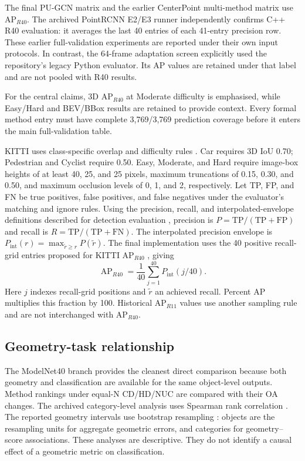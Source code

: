 The final PU-GCN matrix and the earlier CenterPoint multi-method matrix
use AP$_{R40}$. The archived PointRCNN E2/E3 runner independently confirms
C++ R40 evaluation: it averages the last 40 entries of each 41-entry
precision row. These earlier full-validation experiments are reported
under their own input protocols. In contrast, the 64-frame adaptation
screen explicitly used the repository's legacy Python evaluator. Its AP
values are retained under that label and are not pooled with R40 results.

For the central claims, 3D AP$_{R40}$ at Moderate difficulty is emphasised, while Easy/Hard and BEV/BBox results are retained to provide context. Every formal method entry must have complete 3,769/3,769 prediction coverage before it enters the main full-validation table.

KITTI uses class-specific overlap and difficulty rules \cite{kittieval2026}.
Car requires 3D IoU 0.70; Pedestrian and Cyclist require 0.50. Easy,
Moderate, and Hard require image-box heights of at least 40, 25, and
25 pixels, maximum truncations of 0.15, 0.30, and 0.50, and maximum
occlusion levels of 0, 1, and 2, respectively. Let TP, FP, and FN be
true positives, false positives, and false negatives under the evaluator's
matching and ignore rules. Using the precision, recall, and interpolated-envelope definitions described for detection evaluation \cite{everingham2010voc}, precision is $P=\mathrm{TP}/(\mathrm{TP}+\mathrm{FP})$
and recall is $R=\mathrm{TP}/(\mathrm{TP}+\mathrm{FN})$. The interpolated
precision envelope is $P_{\mathrm{int}}(r)=\max_{\tilde r\ge r}P(\tilde r)$.
The final implementation uses the 40 positive recall-grid entries proposed for KITTI AP$_{R40}$ \cite{simonelli2019disentangling}, giving
\begin{equation}
\operatorname{AP}_{R40}=\frac1{40}\sum_{j=1}^{40}P_{\mathrm{int}}(j/40).
\label{eq:ap40}
\end{equation}
Here $j$ indexes recall-grid positions and $\tilde r$ an achieved recall.
Percent AP multiplies this fraction by 100. Historical AP$_{R11}$ values
use another sampling rule and are not interchanged with AP$_{R40}$.

\subsection{Geometry-task relationship}
\label{sec:fc-4-10-4}

The ModelNet40 branch provides the cleanest direct comparison because both geometry and classification are available for the same object-level outputs. Method rankings under equal-N CD/HD/NUC are compared with their OA changes. The archived category-level analysis uses Spearman rank correlation \cite{spearman1904association}. The reported geometry intervals use bootstrap resampling \cite{efron1979bootstrap}: objects are the resampling units for aggregate geometric errors, and categories for geometry--score associations. These analyses are descriptive. They do not identify a causal effect of a geometric metric on classification.


